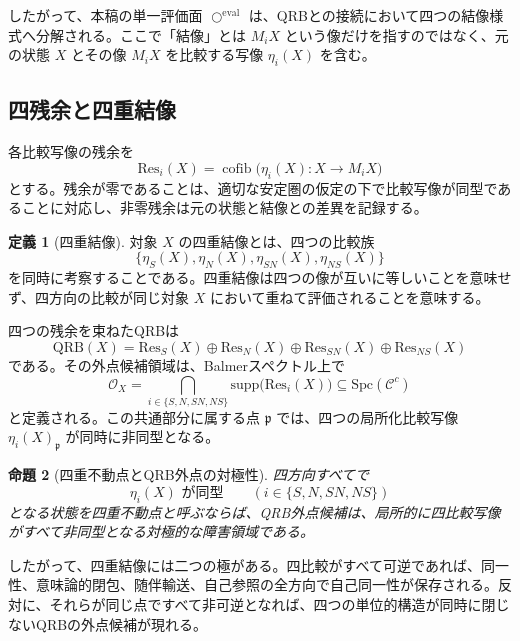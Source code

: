 \documentclass[a4paper,11pt]{ltjsarticle}
\theoremstyle{definition}
\newtheorem{definition}{定義}[section]
\theoremstyle{plain}
\newtheorem{proposition}[definition]{命題}
\newcommand{\CircleEval}{\bigcirc^{\mathrm{eval}}}
\newcommand{\QRB}{\mathrm{QRB}}
\newcommand{\Res}{\mathrm{Res}}
\newcommand{\supp}{\mathrm{supp}}
\newcommand{\Spc}{\mathrm{Spc}}
\begin{document}
したがって、本稿の単一評価面 $\CircleEval$ は、QRBとの接続において四つの結像様式へ分解される。ここで「結像」とは $M_iX$ という像だけを指すのではなく、元の状態 $X$ とその像 $M_iX$ を比較する写像 $\eta_i(X)$ を含む。

\subsection{四残余と四重結像}

各比較写像の残余を
\begin{equation}
 \Res_i(X)
 =
 \operatorname{cofib}\bigl(\eta_i(X):X\to M_iX\bigr)
\end{equation}
とする。残余が零であることは、適切な安定圏の仮定の下で比較写像が同型であることに対応し、非零残余は元の状態と結像との差異を記録する。

\begin{definition}[四重結像]
対象 $X$ の四重結像とは、四つの比較族
\begin{equation}
 \bigl\{\eta_S(X),\eta_N(X),
 \eta_{SN}(X),\eta_{NS}(X)\bigr\}
\end{equation}
を同時に考察することである。四重結像は四つの像が互いに等しいことを意味せず、四方向の比較が同じ対象 $X$ において重ねて評価されることを意味する。
\end{definition}

四つの残余を束ねたQRBは
\begin{equation}
 \QRB(X)
 =
 \Res_S(X)\oplus\Res_N(X)
 \oplus\Res_{SN}(X)\oplus\Res_{NS}(X)
\end{equation}
である。その外点候補領域は、Balmerスペクトル上で
\begin{equation}
 \mathcal O_X
 =
 \bigcap_{i\in\{S,N,SN,NS\}}
 \supp\bigl(\Res_i(X)\bigr)
 \subseteq
 \Spc(\mathcal C^c)
 \label{eq:qrb-external-locus}
\end{equation}
と定義される。この共通部分に属する点 $\mathfrak p$ では、四つの局所化比較写像 $\eta_i(X)_{\mathfrak p}$ が同時に非同型となる。

\begin{proposition}[四重不動点とQRB外点の対極性]
四方向すべてで
\begin{equation}
 \eta_i(X)\text{ が同型}
 \qquad(i\in\{S,N,SN,NS\})
 \label{eq:fourfold-fixed-point}
\end{equation}
となる状態を四重不動点と呼ぶならば、QRB外点候補は、局所的に四比較写像がすべて非同型となる対極的な障害領域である。
\end{proposition}

したがって、四重結像には二つの極がある。四比較がすべて可逆であれば、同一性、意味論的閉包、随伴輸送、自己参照の全方向で自己同一性が保存される。反対に、それらが同じ点ですべて非可逆となれば、四つの単位的構造が同時に閉じないQRBの外点候補が現れる。
\end{document}
